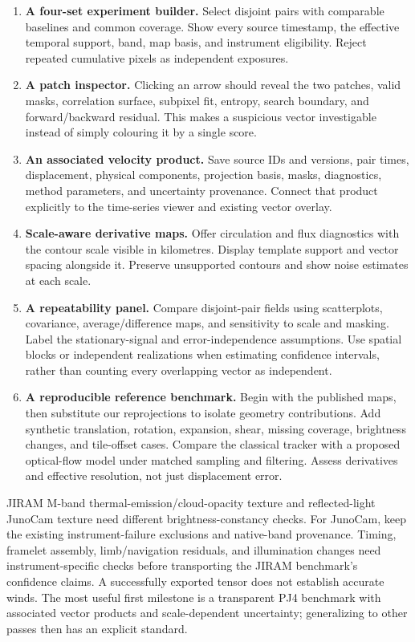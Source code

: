 \documentclass[11pt]{article}
\begin{document}
\begin{enumerate}
 \item \textbf{A four-set experiment builder.} Select disjoint pairs with
 comparable baselines and common coverage. Show every source timestamp,
 the effective temporal support, band, map basis, and instrument eligibility.
 Reject repeated cumulative pixels as independent exposures.

 \item \textbf{A patch inspector.} Clicking an arrow should reveal the two
 patches, valid masks, correlation surface, subpixel fit, entropy, search
 boundary, and forward/backward residual. This makes a suspicious vector
 investigable instead of simply colouring it by a single score.

 \item \textbf{An associated velocity product.} Save source IDs and versions,
 pair times, displacement, physical components, projection basis, masks,
 diagnostics, method parameters, and uncertainty provenance. Connect that
 product explicitly to the time-series viewer and existing vector overlay.

 \item \textbf{Scale-aware derivative maps.} Offer circulation and flux
 diagnostics with the contour scale visible in kilometres. Display template
 support and vector spacing alongside it. Preserve unsupported contours and
 show noise estimates at each scale.

 \item \textbf{A repeatability panel.} Compare disjoint-pair fields using
 scatterplots, covariance, average/difference maps, and sensitivity to scale
 and masking. Label the stationary-signal and error-independence assumptions.
 Use spatial blocks or independent realizations when estimating confidence
 intervals, rather than counting every overlapping vector as independent.

 \item \textbf{A reproducible reference benchmark.} Begin with the published
 maps, then substitute our reprojections to isolate geometry contributions.
 Add synthetic translation, rotation, expansion, shear, missing coverage,
 brightness changes, and tile-offset cases. Compare the classical tracker
 with a proposed optical-flow model under matched sampling and filtering.
 Assess derivatives and effective resolution, not just displacement error.
\end{enumerate}

JIRAM M-band thermal-emission/cloud-opacity texture and reflected-light
JunoCam texture need different brightness-constancy checks.
For JunoCam, keep the existing instrument-failure exclusions and native-band
provenance. Timing, framelet assembly, limb/navigation residuals, and
illumination changes need instrument-specific checks before transporting
the JIRAM benchmark's confidence claims. A successfully exported tensor
does not establish accurate winds. The most useful first milestone is a
transparent PJ4 benchmark with associated vector products and scale-dependent
uncertainty; generalizing to other passes then has an explicit standard.
\end{document}
